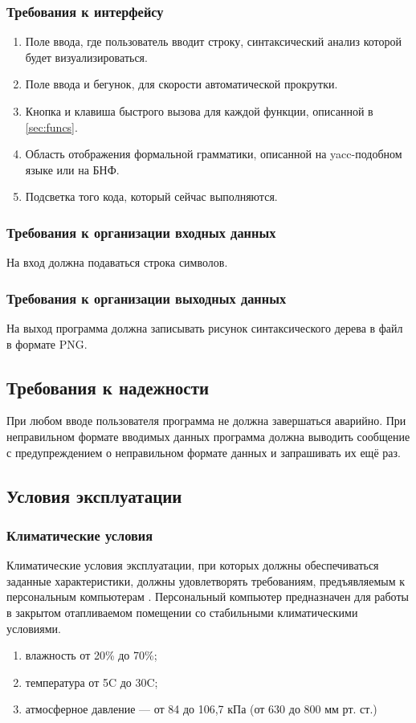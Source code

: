 \documentclass[a4paper,12pt,reqno]{article}
\begin{document}
  \subsubsection{Требования к интерфейсу}
  \begin{enumerate}
    \item Поле ввода, где пользователь вводит строку, синтаксический анализ которой будет визуализироваться.
    \item Поле ввода и бегунок, для скорости автоматической прокрутки.
    \item Кнопка и клавиша быстрого вызова для каждой функции, описанной в \autoref{sec:funcs}.
    \item Область отображения формальной грамматики, описанной на yacc-подобном языке или на БНФ.
    \item Подсветка того кода, который сейчас выполняются.
  \end{enumerate}

  \subsubsection{Требования к организации входных данных}
  На вход должна подаваться строка символов.
  \subsubsection{Требования к организации выходных данных}
  На выход программа должна записывать рисунок синтаксического дерева в файл в формате PNG.
  \subsection{Требования к надежности}
  При любом вводе пользователя программа не должна завершаться аварийно.
  При неправильном формате вводимых данных программа должна выводить сообщение с предупреждением о неправильном формате данных
  и запрашивать их ещё раз.

  \subsection{Условия эксплуатации}
  \subsubsection{Климатические условия}
  Климатические условия эксплуатации, при которых должны обеспечиваться заданные характеристики, должны удовлетворять требованиям, предъявляемым к персональным компьютерам \cite{gostclimate}.
  Персональный компьютер предназначен для работы в закрытом отапливаемом помещении со стабильными климатическими условиями.
  \begin{enumerate}
    \item влажность от 20\% до 70\%;
    \item температура от 5\degree C до 30\degree C;
    \item атмосферное давление --- от 84 до 106,7 кПа (от 630 до 800 мм рт. ст.)
  \end{enumerate}
\end{document}
